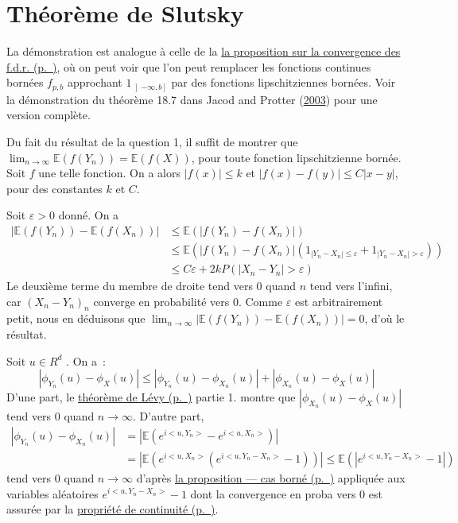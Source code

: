 \section{Théorème de Slutsky}\label{IV-thuxe9oruxe8me-de-slutsky-1}

\label{IV-answer-slut1}
La démonstration est analogue à celle de la
\protect\hyperref[IV-cvceloifdr]{la proposition sur la convergence des
f.d.r. (p.~\pageref*{IV-cvceloifdr})}, où on peut voir que l'on peut
remplacer les fonctions continues bornées \(f_{p,b}\) approchant
\(1_{\left]-\infty,b\right]}\) par des fonctions lipschitziennes
bornées. Voir la démonstration du théorème 18.7 dans Jacod and Protter
(\protect\hyperlink{refIV-Jacod}{2003}) pour une version complète.

\label{IV-answer-slut2}
Du fait du résultat de la question 1, il suffit de montrer que
\(\lim_{n \to \infty} \mathbb{E}(f (Y_n)) = \mathbb{E}(f (X))\), pour
toute fonction lipschitzienne bornée. Soit \(f\) une telle fonction. On
a alors \(|f (x)| \leq k\) et \(|f (x) -f (y)| \leq C|x - y|\), pour des
constantes \(k\) et \(C\).

Soit \(\varepsilon > 0\) donné. On a \begin{align*}
|\mathbb{E}(f (Y_n )) - \mathbb{E}(f (X_n ))| &\leq \mathbb{E}(|f (Y_n) - f (X_n )|) \\
                                  &\leq \mathbb{E}(|f (Y_n) - f (X_n )|(1_{|Y_n-X_n|\leq \varepsilon} + 1_{|Y_n-X_n| > \varepsilon}))\\
                                  &\leq C \varepsilon + 2k P(|X_n - Y_n | > \varepsilon)
\end{align*} Le deuxième terme du membre de droite tend vers 0 quand
\(n\) tend vers l'infini, car \((X_n - Y_n )_n\) converge en probabilité
vers 0. Comme \(\varepsilon\) est arbitrairement petit, nous en
déduisons que
\(\lim_{n\to\infty}|\mathbb{E}(f (Y_n )) - \mathbb{E}(f (X_n ))| = 0\),
d'où le résultat.

\label{IV-answer-slut3}
Soit \(u \in R^d\) . On a~:
\[|\phi_{Y_n} (u) - \phi_X (u)| \leq |\phi_{Y_n} (u) - \phi_{X_n} (u)| + |\phi_{X_n} (u) - \phi_{X} (u)|\]
D'une part, le \protect\hyperref[IV-levytheorem]{théorème de
Lévy (p.~\pageref*{IV-levytheorem})} partie 1. montre que
\(|\phi_{X_n}(u) - \phi_X (u)|\) tend vers 0 quand \(n \to \infty\).
D'autre part, \begin{align*}
|\phi_{Y_n} (u) - \phi_{X_n} (u)|  & = |\mathbb{E}(e^{i< u, Y_n>} - e^{i< u, X_n>})| \\
& = |\mathbb{E}(e^{i<u,X_n>} (e^{i<u,Y_n-X_n>} - 1))|\leq \mathbb{E}(|e^{i<u,Y_n-X_n>} - 1|)
\end{align*} tend vers 0 quand \(n \to \infty\) d'après
\protect\hyperref[IV-propconv2]{la proposition --- cas
borné (p.~\pageref*{IV-propconv2})} appliquée aux variables aléatoires
\(e^{i<u,Y_n -X_n>}-1\) dont la convergence en proba vers 0 est assurée
par la \protect\hyperref[IV-propconv4]{propriété de
continuité (p.~\pageref*{IV-propconv4})}.
